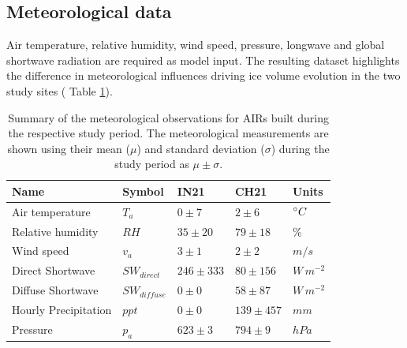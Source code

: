 \subsection{Meteorological data}

Air temperature, relative humidity, wind speed, pressure, longwave and global shortwave radiation are required
as model input.  The resulting dataset highlights the difference in
meteorological influences driving ice volume evolution in the two study sites ( Table
\ref{tab:Observations}).


\begin{table}
	\centering
	\caption{Summary of the meteorological observations for \ac{AIRs} built during the respective study period.
		The meteorological measurements are shown using their mean ($\mu$) and standard deviation ($\sigma$) during the study
		period as $\mu \pm \sigma$. }

	\label{tab:Observations}
	\begin{tabular}{|lllll|}
		\hline
		\textbf{Name}        & \textbf{Symbol} & \textbf{IN21} & \textbf{CH21} & \textbf{Units} \\ \hline
		Air temperature      & $T_a    $       & $0 \pm 7$     & $2 \pm 6$     & $^{\circ} C$    \\
		Relative humidity    & $RH     $       & $35 \pm 20$   & $79 \pm 18$   & \%             \\
		Wind speed           & $v_a        $   & $3 \pm 1$     & $2 \pm 2$     & $m/s$          \\
		Direct Shortwave     & $SW_{direct} $  & $246 \pm 333$ & $80 \pm 156$  & $W\,m^{-2}$    \\
		Diffuse Shortwave    & $SW_{diffuse}$  & $0 \pm 0$     & $58 \pm 87$   & $W\,m^{-2}$    \\
		Hourly Precipitation & $ppt        $   & $0 \pm 0$     & $139 \pm 457$ & $mm$           \\
		Pressure             & $p_a         $  & $623 \pm 3$   & $794 \pm 9$   & $hPa$          \\\hline
	\end{tabular}
\end{table}


